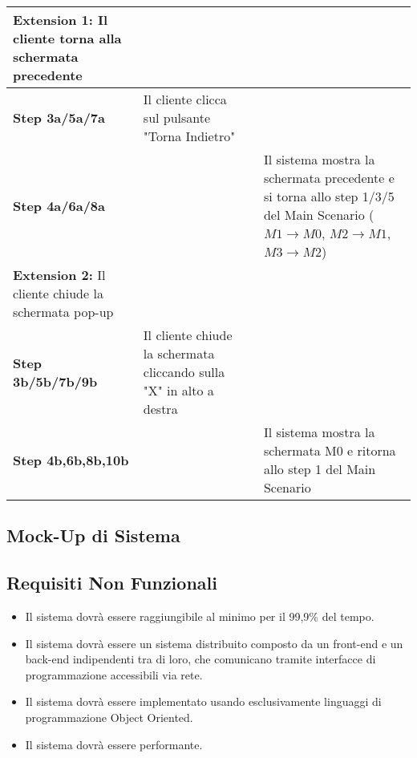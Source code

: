 \begin{longtable}{|m{4cm}|m{4cm}|m{3cm}|m{4cm}|}
    \hline
        \textbf{Extension 1:} \newline  Il cliente torna alla schermata precedente & & &\\
        \hline
        \textbf{Step 3a/5a/7a} & Il cliente clicca sul pulsante "Torna Indietro"& & \\
        \hline
        \textbf{Step 4a/6a/8a} & & & Il sistema mostra la schermata precedente e si torna allo step 1/3/5 del Main Scenario ($M1 \to M0$, $M2 \to M1$, $M3 \to M2$) \\
        \hline
        \textbf{Extension 2:} \newline Il cliente chiude la schermata pop-up & & &\\
        \hline
        \textbf{Step 3b/5b/7b/9b} & Il cliente chiude la schermata cliccando sulla "X" in alto a destra & &\\
        \hline
        \textbf{Step 4b,6b,8b,10b} & & & Il sistema mostra la schermata M0 e ritorna allo step 1 del Main Scenario \\
        \hline
    \end{longtable}
        \subsection{Mock-Up di Sistema}
        \subsection{Requisiti Non Funzionali}
            \begin{itemize}
                \item Il sistema dovrà essere raggiungibile al minimo per il 99,9\% del tempo.
                \item Il sistema dovrà essere un sistema distribuito composto da un front-end e un back-end indipendenti tra di loro, che comunicano tramite interfacce di programmazione accessibili via rete.
                \item Il sistema dovrà essere implementato usando esclusivamente linguaggi di programmazione Object Oriented.
                \item Il sistema dovrà essere performante.
        
            \end{itemize}


    

